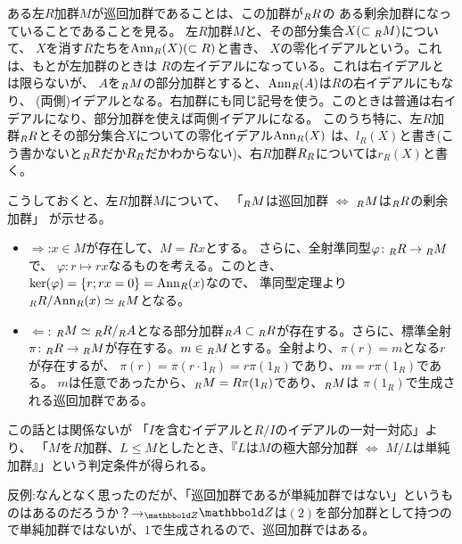 \documentclass[9pt]{ltjsarticle}
\begin{document}
ある左$R$加群$M$が巡回加群であることは、この加群が${}_{R}R$の
ある剰余加群になっていることであることを見る。
左$R$加群$M$と、その部分集合$X (\subset {}_{R}M)$について、
$X$を消す$R$たちを$\mathrm{Ann}_R(X) (\subset R)$と書き、
$X$の零化イデアルという。これは、もとが左加群のときは
$R$の左イデアルになっている。これは右イデアルとは限らないが、
$A$を${}_{R}M$の部分加群とすると、$\mathrm{Ann}_R(A)$は$R$の右イデアルにもなり、
(両側)イデアルとなる。右加群にも同じ記号を使う。このときは普通は右イデアルになり、部分加群を使えば両側イデアルになる。
このうち特に、左$R$加群${}_{R}R$とその部分集合$X$についての零化イデアル$\mathrm{Ann}_R(X)$
は、$l_R(X)$と書き(こう書かないと${}_{R}R$だか$R{}_{R}$だかわからない)、右$R$加群$R{}_{R}$については$r_R(X)$と書く。

こうしておくと、左$R$加群$M$について、
「${}_{R}M$は巡回加群 $\iff$ ${}_{R}M$は${}_{R}R$の剰余加群」
が示せる。
\begin{myproof}
  \begin{itemize}
    \item $\Rightarrow$:$x\in M$が存在して、$M = Rx$とする。
    さらに、全射準同型$\varphi \colon {}_{R}R \to {}_{R}M$で、
    $\varphi\colon r\mapsto rx$なるものを考える。このとき、
    $\ker(\varphi) = \left\{r ; rx=0\right\} = \mathrm{Ann}_R(x)$なので、
    準同型定理より${}_{R}R/\mathrm{Ann}_R(x) \simeq {}_{R}M$となる。
    \item $\Leftarrow$:
    ${}_{R}M \simeq {}_{R}R/{}_{R}A$となる部分加群${}_{R}A \subset {}_{R}R$が存在する。さらに、標準全射
    $\pi\colon {}_{R}R \to {}_{R}M$が存在する。$m \in {}_{R}M$とする。全射より、$\pi(r) = m$となる$r$が存在するが、
    $\pi(r) = \pi(r\cdot 1_R) = r\pi(1_R)$であり、$m = r\pi(1_R)$である。
    $m$は任意であったから、${}_{R}M = R\pi(1_R)$であり、${}_{R}M$は
    $\pi(1_R)$で生成される巡回加群である。
  \end{itemize}
\end{myproof}

この話とは関係ないが
「$I$を含むイデアルと$R/I$のイデアルの一対一対応」より、
「$M$を$R$加群、$L \le M$としたとき、『$L$は$M$の極大部分加群
$\iff$ $M/L$は単純加群』」という判定条件が得られる。

反例:なんとなく思ったのだが、「巡回加群であるが単純加群ではない」というものはあるのだろうか？→$\Lmod{\Z}\Z$は$(2)$を部分加群として持つので単純加群ではないが、$1$で生成されるので、巡回加群ではある。
\end{document}
